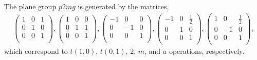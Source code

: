The plane group $p2mg$ is generated by the matrices,
\begin{align*}
  \left(
    \begin{array}{cc|c}
        1 & 0 & 1 \\
        0 & 1 & 0 \\
        \hline
        0 & 0 & 1 \\
    \end{array}
  \right),
  \left(
    \begin{array}{cc|c}
        1 & 0 & 0 \\
        0 & 1 & 1 \\
        \hline
        0 & 0 & 1 \\
    \end{array}
  \right),
  \left(
    \begin{array}{cc|c}
        -1 & 0 & 0 \\
        0 & -1 & 0 \\
        \hline
        0 & 0 & 1 \\
    \end{array}
  \right),
  \left(
    \begin{array}{cc|c}
        -1 & 0 & \frac{1}{2} \\
        0 & 1 & 0 \\
        \hline
        0 & 0 & 1 \\
    \end{array}
  \right),
  \left(
    \begin{array}{cc|c}
        1 & 0 & \frac{1}{2} \\
        0 & -1 & 0 \\
        \hline
        0 & 0 & 1 \\
    \end{array}
  \right),
\end{align*}
which correspond to $t(1, 0)$, $t(0, 1)$, $2$, $m$, and $a$ operations, respectively.

